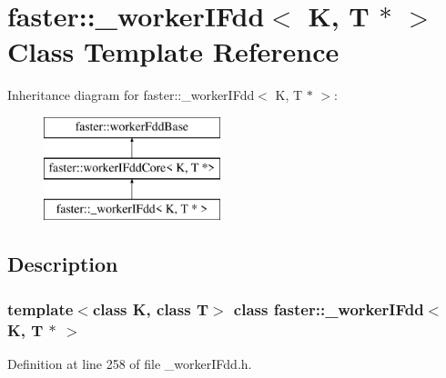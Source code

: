 \hypertarget{classfaster_1_1__workerIFdd_3_01K_00_01T_01_5_01_4}{}\section{faster\+:\+:\+\_\+worker\+I\+Fdd$<$ K, T $\ast$ $>$ Class Template Reference}
\label{classfaster_1_1__workerIFdd_3_01K_00_01T_01_5_01_4}
Inheritance diagram for faster\+:\+:\+\_\+worker\+I\+Fdd$<$ K, T $\ast$ $>$\+:\begin{figure}[H]
\begin{center}
\leavevmode
\includegraphics[height=3.000000cm]{classfaster_1_1__workerIFdd_3_01K_00_01T_01_5_01_4}
\end{center}
\end{figure}


\subsection{Description}
\subsubsection*{template$<$class K, class T$>$\newline
class faster\+::\+\_\+worker\+I\+Fdd$<$ K, T $\ast$ $>$}



Definition at line 258 of file \+\_\+worker\+I\+Fdd.\+h.

